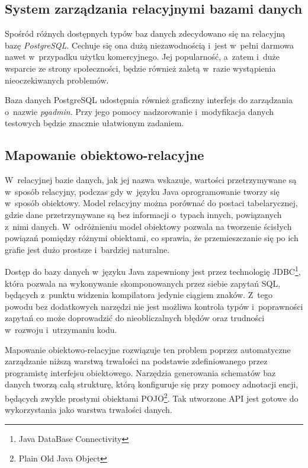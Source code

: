 \documentclass[11pt]{aghdpl}
\begin{document}
\subsection{System zarządzania relacyjnymi bazami danych}

Spośród różnych dostępnych typów baz danych zdecydowano się na relacyjną bazę \emph{PostgreSQL}. Cechuje się ona dużą niezawodnością i~jest w~pełni darmowa nawet w~przypadku użytku komercyjnego. Jej popularność, a~zatem i~duże wsparcie ze strony społeczności, będzie również zaletą w~razie wystąpienia nieoczekiwanych problemów.

Baza danych PostgreSQL udostępnia również graficzny interfejs do zarządzania o~nazwie \emph{pgadmin}. Przy jego pomocy nadzorowanie i~modyfikacja danych testowych będzie znacznie ułatwionym zadaniem.

\subsection{Mapowanie obiektowo-relacyjne}

W~relacyjnej bazie danych, jak jej nazwa wskazuje, wartości przetrzymywane są w~sposób relacyjny, podczas gdy w~języku Java oprogramowanie tworzy się w~sposób obiektowy. Model relacyjny można porównać do postaci tabelarycznej, gdzie dane przetrzymywane są bez informacji o~typach innych, powiązanych z~nimi danych. W~odróżnieniu model obiektowy pozwala na tworzenie ścisłych powiązań pomiędzy różnymi obiektami, co sprawia, że przemieszczanie się po ich grafie jest dużo prostsze i~bardziej naturalne.

Dostęp do bazy danych w~języku Java zapewniony jest przez technologię JDBC\footnote{Java DataBase Connectivity}, która pozwala na wykonywanie skomponowanych przez siebie zapytań SQL, będących z~punktu widzenia kompilatora jedynie ciągiem znaków. Z~tego powodu bez dodatkowych narzędzi nie jest możliwa kontrola typów i~poprawności zapytań co może doprowadzić do nieobliczalnych błędów oraz trudności w~rozwoju i~utrzymaniu kodu.

Mapowanie obiektowo-relacyjne rozwiązuje ten problem poprzez automatyczne zarządzanie niższą warstwą trwałości na podstawie zdefiniowanego przez programistę interfejsu obiektowego. Narzędzia generowania schematów baz danych tworzą całą strukturę, którą konfiguruje się przy pomocy adnotacji encji, będących zwykle prostymi obiektami POJO\footnote{Plain Old Java Object}. Tak utworzone API jest gotowe do wykorzystania jako warstwa trwałości danych.
\end{document}

